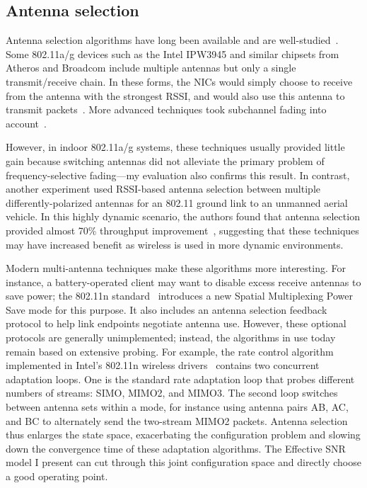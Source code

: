 \subsection{Antenna selection}
Antenna selection algorithms have long been available and are well-studied~\cite{Tse}. Some 802.11a/g devices such as the Intel IPW3945 and similar chipsets from Atheros and Broadcom include multiple antennas but only a single transmit/receive chain. In these forms, the NICs would simply choose to receive from the antenna with the strongest RSSI, and would also use this antenna to transmit packets~\cite{Broadcom_MIMOChip,Cheng_AntSel}. More advanced techniques took subchannel fading into account~\cite{Zhang_AntSel}.

However, in indoor 802.11a/g systems, these techniques usually provided little gain because switching antennas did not alleviate the primary problem of frequency-selective fading---my evaluation also confirms this result. In contrast, another experiment used RSSI-based antenna selection between multiple differently-polarized antennas for an 802.11 ground link to an unmanned aerial vehicle. In this highly dynamic scenario, the authors found that antenna selection provided almost 70\% throughput improvement~\cite{Vlah_UAV}, suggesting that these techniques may have increased benefit as wireless is used in more dynamic environments.

Modern multi-antenna techniques make these algorithms more interesting. For instance, a battery-operated client may want to disable excess receive antennas to save power; the 802.11n standard~\cite{80211n} introduces a new Spatial Multiplexing Power Save mode for this purpose. It also includes an antenna selection feedback protocol to help link endpoints negotiate antenna use. However, these optional protocols are generally unimplemented; instead, the algorithms in use today remain based on extensive probing. For example, the rate control algorithm implemented in Intel's 802.11n wireless drivers~\cite{iwlwifi} contains two concurrent adaptation loops. One is the standard rate adaptation loop that probes different numbers of streams: SIMO, MIMO2, and MIMO3. The second loop switches between antenna sets within a mode, for instance using antenna pairs AB, AC, and BC to alternately send the two-stream MIMO2 packets. Antenna selection thus enlarges the state space, exacerbating the configuration problem and slowing down the convergence time of these adaptation algorithms. The Effective SNR model I present can cut through this joint configuration space and directly choose a good operating point.

